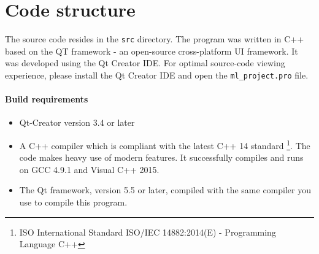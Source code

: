 \documentclass[12pt,a4paper]{article}
\begin{document}
\section{Code structure}
The source code resides in the \texttt{src} directory. The program was written in C++ based on the QT framework - an open-source cross-platform UI framework. It was developed using the Qt Creator IDE. For optimal source-code viewing experience, please install the Qt Creator IDE and open the \texttt{ml\_project.pro} file.

\paragraph{Build requirements}
\begin{itemize}
	\item Qt-Creator version 3.4 or later
	\item A C++ compiler which is compliant with the latest C++ 14 standard \footnote{ISO International Standard ISO/IEC 14882:2014(E) - Programming Language C++}. The code makes heavy use of modern features. It successfully compiles and runs on GCC 4.9.1 and Visual C++ 2015.
	\item The Qt framework, version 5.5 or later, compiled with the same compiler you use to compile this program.
\end{itemize}
\end{document}
